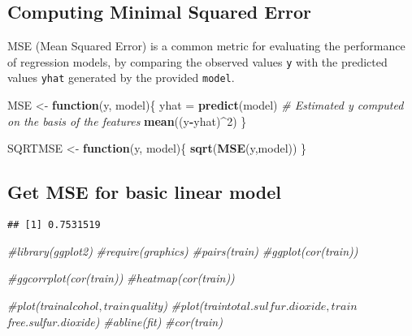 \documentclass[
]{article}
\newenvironment{Shaded}{\begin{snugshade}}{\end{snugshade}}
\newcommand{\AttributeTok}[1]{\textcolor[rgb]{0.13,0.29,0.53}{#1}}
\newcommand{\CommentTok}[1]{\textcolor[rgb]{0.56,0.35,0.01}{\textit{#1}}}
\newcommand{\ControlFlowTok}[1]{\textcolor[rgb]{0.13,0.29,0.53}{\textbf{#1}}}
\newcommand{\DecValTok}[1]{\textcolor[rgb]{0.00,0.00,0.81}{#1}}
\newcommand{\FunctionTok}[1]{\textcolor[rgb]{0.13,0.29,0.53}{\textbf{#1}}}
\newcommand{\NormalTok}[1]{#1}
\newcommand{\OtherTok}[1]{\textcolor[rgb]{0.56,0.35,0.01}{#1}}
\newcommand{\SpecialCharTok}[1]{\textcolor[rgb]{0.81,0.36,0.00}{\textbf{#1}}}
\begin{document}
\hypertarget{computing-minimal-squared-error}{%
\subsection{Computing Minimal Squared
Error}\label{computing-minimal-squared-error}}

MSE (Mean Squared Error) is a common metric for evaluating the
performance of regression models, by comparing the observed values
\texttt{y} with the predicted values \texttt{yhat} generated by the
provided \texttt{model}.

\begin{Shaded}
\begin{Highlighting}[]
\NormalTok{MSE }\OtherTok{\textless{}{-}} \ControlFlowTok{function}\NormalTok{(y, model)\{}
\NormalTok{  yhat }\OtherTok{=} \FunctionTok{predict}\NormalTok{(model) }\CommentTok{\# Estimated y computed on the basis of the features}
  \FunctionTok{mean}\NormalTok{((y}\SpecialCharTok{{-}}\NormalTok{yhat)}\SpecialCharTok{\^{}}\DecValTok{2}\NormalTok{)}
\NormalTok{\}}

\NormalTok{SQRTMSE }\OtherTok{\textless{}{-}} \ControlFlowTok{function}\NormalTok{(y, model)\{}
  \FunctionTok{sqrt}\NormalTok{(}\FunctionTok{MSE}\NormalTok{(y,model))}
\NormalTok{\}}
\end{Highlighting}
\end{Shaded}

\hypertarget{get-mse-for-basic-linear-model}{%
\subsection{Get MSE for basic linear
model}\label{get-mse-for-basic-linear-model}}

\begin{Shaded}
\end{Shaded}

\begin{verbatim}
## [1] 0.7531519
\end{verbatim}

\begin{Shaded}
\begin{Highlighting}[]
\CommentTok{\#library(ggplot2)}
\CommentTok{\#require(graphics)}
\CommentTok{\#pairs(train)}
\CommentTok{\#ggplot(cor(train))}

\CommentTok{\#ggcorrplot(cor(train))}
\CommentTok{\#heatmap(cor(train))}

\CommentTok{\#plot(train$alcohol, train$quality)}
\CommentTok{\#plot(train$total.sulfur.dioxide, train$free.sulfur.dioxide)}
\CommentTok{\#abline(fit)}
\CommentTok{\#cor(train)}
\end{Highlighting}
\end{Shaded}
\end{document}
